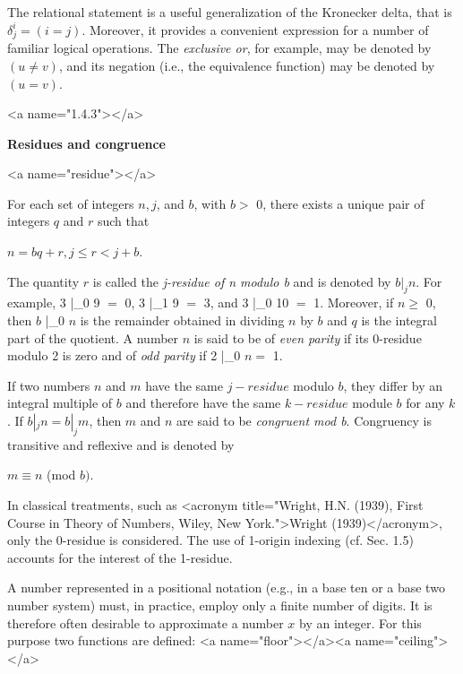 \par The relational statement is a useful generalization of the Kronecker delta, that is $δ_j^i = (i = j)$. Moreover, it provides a convenient expression for a number of familiar logical operations. The \textit{exclusive or}, for example, may be denoted by $(u \neq v)$, and its negation (i.e., the equivalence function) may be denoted by $(u = v)$.

<a name="1.4.3"></a>
\par \textbf{Residues and congruence}

<a name="residue"></a>
\par For each set of integers $n, j$, and $b$, with $b >$ 0, there exists a unique pair of integers $q$ and $r$ such that

\par $n = bq + r, j \leq r < j + b$.

\par The quantity $r$ is called the \textit{j-residue of n modulo b} and is denoted by $b |_j n$. For example, 3 |_0 9 $=$ 0, 3 |_1 9 $=$ 3, and 3 |_0 10 $=$ 1. Moreover, if $n \geq$ 0, then $b$ |_0 $n$ is the remainder obtained in dividing $n$ by $b$ and $q$ is the integral part of the quotient. A number $n$ is said to be of \textit{even parity} if its 0-residue modulo 2 is zero and of \textit{odd parity} if 2 |_0 $n =$ 1.

\par If two numbers $n$ and $m$ have the same $j-residue$ modulo $b$, they differ by an integral multiple of $b$ and therefore have the same $k-residue$ module $b$ for any $k$. If $b |_j n = b |_j m$, then $m$ and $n$ are said to be \textit{congruent mod b}. Congruency is transitive and reflexive and is denoted by

\par $m \equiv n$ (mod $b)$.

\par In classical treatments, such as
<acronym title="Wright, H.N. (1939), First Course in Theory of Numbers, Wiley, New York.">Wright (1939)</acronym>, only the 0-residue is considered. The use of 1-origin indexing (cf. Sec. 1.5) accounts for the interest of the 1-residue.

\par A number represented in a positional notation (e.g., in a base ten or a base two number system) must, in practice, employ only a finite number of digits. It is therefore often desirable to approximate a number $x$ by an integer. For this purpose two functions are defined:
<a name="floor"></a><a name="ceiling"></a>

